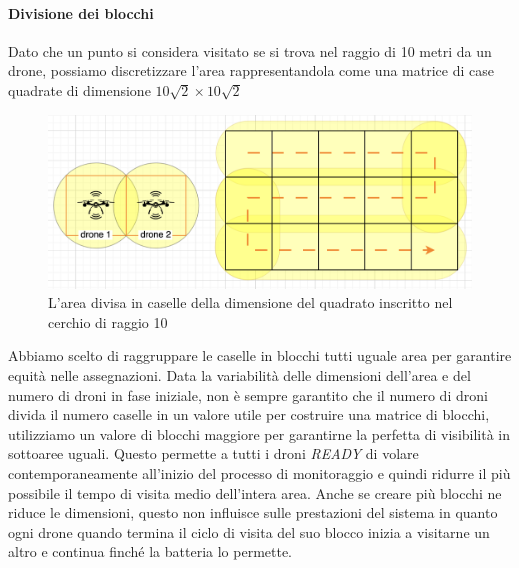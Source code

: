 \documentclass[a4paper, 11pt]{article}
\begin{document}
\paragraph*{Divisione dei blocchi}
Dato che un punto si considera visitato se si trova nel raggio di 10 metri da un drone, possiamo discretizzare l'area rappresentandola come una matrice di case quadrate di dimensione $10\sqrt{2} \times 10\sqrt{2}$
\begin{figure}[h]
    \centering
    \includegraphics[height = 5 cm]{image/areedroni.png}
    \caption{L'area divisa in caselle della dimensione del quadrato inscritto nel cerchio di raggio 10}
\end{figure}

Abbiamo scelto di raggruppare le caselle in blocchi tutti uguale area per garantire equità nelle assegnazioni. 
Data la variabilità delle dimensioni dell'area e del numero di droni in fase iniziale, non è sempre garantito che il numero di droni divida il numero caselle in un valore utile per costruire una matrice di blocchi, utilizziamo un valore di blocchi maggiore per garantirne la perfetta di visibilità in sottoaree uguali.
Questo permette a tutti i droni \textit{READY} di volare contemporaneamente all'inizio del processo di monitoraggio e quindi ridurre il più possibile il tempo di visita medio dell'intera area.
Anche se creare più blocchi ne riduce le dimensioni, questo non influisce sulle prestazioni del sistema in quanto ogni drone quando termina il ciclo di visita del suo blocco inizia a visitarne un altro e continua finché la batteria lo permette.
\end{document}
